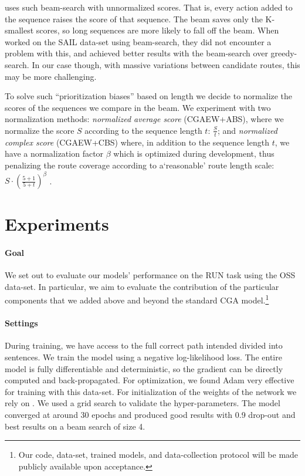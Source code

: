\documentclass[11pt,a4paper]{article}
\begin{document}
\citet{mei2015listen} uses such beam-search with unnormalized scores. That is, every action added to the sequence raises the score of that sequence. The beam saves only the K-smallest scores, so long sequences are more likely to fall off the beam.
When \citet{mei2015listen} worked on the SAIL data-set using beam-search, they did not encounter a problem with this, and achieved better results with the beam-search over greedy-search. In our case though, with massive variations between candidate routes, this may be more challenging.

To solve such \enquote{prioritization biases} based on length  we decide to normalize the scores of the sequences we compare in the beam.  We experiment with two normalization methods: {\em normalized average score} (CGAEW+ABS), where we normalize the score $S$ according to the sequence length $t$:  \( \frac{S}{t} \); and {\em normalized complex score} (CGAEW+CBS) \citep{wu2016google} where, in addition to the sequence length $t$, we have a normalization factor $\beta$ which is optimized during development, thus penalizing the route coverage according to a\enquote*{reasonable} route length scale:  $S \cdot \left(\frac{5+1}{5+t}\right)^\beta$ . 



\section{Experiments}
\label{expirement}
\paragraph{Goal}We set out to evaluate our models' performance on the RUN task using the OSS data-set. In particular, we aim to evaluate the  contribution of the particular components that we added above and beyond the standard CGA model.\footnote{Our code, data-set, trained models, and data-collection protocol will be made publicly available upon acceptance.} 







\paragraph{Settings}


 During training, we have access to the full correct path intended divided into sentences. We train the model using a negative log-likelihood loss. The entire model   is fully differentiable and deterministic, so the gradient can be directly computed and back-propagated.
For optimization, we found Adam \citep{kingma2014adam}
 very effective for training with this data-set. For initialization of the weights of the network we rely on  \citet{glorot2010understanding}. 
We used a grid search to validate the hyper-parameters. The model converged at around 30 epochs and produced good results with 0.9 drop-out and best results on a beam search of size 4.
\end{document}
